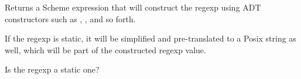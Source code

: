 \begin{desc}
Returns a Scheme expression that will construct the regexp 
using ADT constructors such as , ,
and so forth.

If the regexp is static, it will be simplified and pre-translated
to a Posix string as well, which will be part of the constructed
regexp value.
\end{desc}

\begin{desc}
Is the regexp a static one?
\end{desc}

